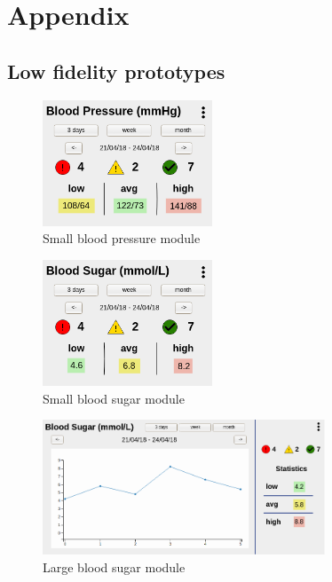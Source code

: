 \newpage
\appendix

\section{Appendix}

\subsection{Low fidelity prototypes} \label{app_low_fidelity}

\begin{figure}[!htb]
    \centering
    \includegraphics[width=0.45\textwidth]{chapters/3_design/mockups/bp_small}
    \caption{Small blood pressure module}\label{fig:bp_small}
\end{figure}

\begin{figure}[!htb]
    \centering
    \includegraphics[width=0.45\textwidth]{chapters/3_design/mockups/bs_small}
    \caption{Small blood sugar module}\label{fig:bs_small}
\end{figure}

\begin{figure}[!htb]
    \centering
    \includegraphics[width=0.75\textwidth]{chapters/3_design/mockups/bs_large}
    \caption{Large blood sugar module}\label{fig:bs_large}
\end{figure}

